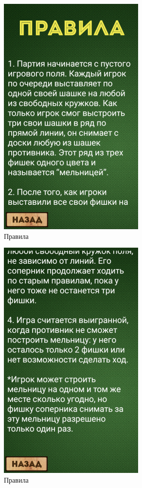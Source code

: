 \documentclass[a4paper]{article}
\begin{document}
\begin{figure}[H]
	\begin{center}
		\includegraphics[scale = 0.8]{screens/RegulationsActivity.png}
		\caption{Правила} 
		\label{pic:pic_name} %
	\end{center}
\end{figure}

\begin{figure}[H]
	\begin{center}
		\includegraphics[scale = 0.8]{screens/RegulationsActivity_2.png}
		\caption{Правила} 
		\label{pic:pic_name} %
	\end{center}
\end{figure}
\end{document}
